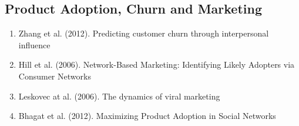 \subsection{Product Adoption, Churn and Marketing}  
\begin{enumerate}  
\item Zhang et al. (2012). Predicting customer churn through interpersonal inﬂuence \cite{Zhang_2012}
\item Hill et al. (2006).  Network-Based Marketing: Identifying Likely Adopters via Consumer Networks\cite{Hill_2006}  
\item Leskovec at al. (2006). The dynamics of viral marketing \cite{Leskovec:2007:DVM:1232722.1232727}  
\item Bhagat et al. (2012). Maximizing Product Adoption in Social Networks\cite{Bhagat:2012:MPA:2124295.2124368} 
\end{enumerate} 